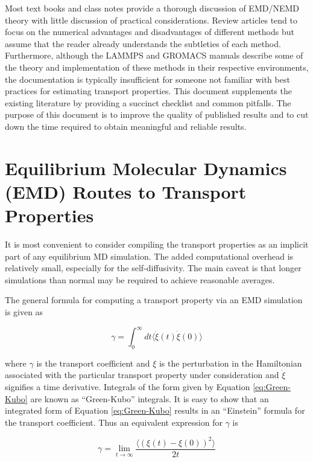 \documentclass[9pt]{livecoms}
\begin{document}
Most text books and class notes provide a thorough discussion of EMD/NEMD theory with little discussion of practical considerations. Review articles tend to focus on the numerical advantages and disadvantages of different methods but assume that the reader already understands the subtleties of each method. Furthermore, although the LAMMPS and GROMACS manuals describe some of the theory and implementation of these methods in their respective environments, the documentation is typically insufficient for someone not familiar with best practices for estimating transport properties. This document supplements the existing literature by providing a succinct checklist and common pitfalls. The purpose of this document is to improve the quality of published results and to cut down the time required to obtain meaningful and reliable results. %

\section{Equilibrium Molecular Dynamics (EMD) Routes to Transport Properties}

It is most convenient to consider compiling the transport properties as an implicit part of any equilibrium MD simulation. The added computational overhead is relatively small, especially for the self-diffusivity. The main caveat is that longer simulations than normal may be required to achieve reasonable averages. 

The general formula for computing a transport property via an EMD simulation is given as

\begin{equation} \label{eq:Green-Kubo}
\gamma = \int_{0}^{\infty}dt\langle\dot{\xi}(t)\dot{\xi}(0)\rangle
\end{equation}

where $\gamma$ is the transport coefficient and $\xi$ is the perturbation in the Hamiltonian associated with the particular transport property under consideration and $\dot{\xi}$ signifies a time derivative. Integrals of the form given by Equation \ref{eq:Green-Kubo} are known as “Green-Kubo” integrals. It is easy to show that an integrated form of Equation \ref{eq:Green-Kubo} results in an “Einstein” formula for the transport coefficient. Thus an equivalent expression for $\gamma$ is

\begin{equation} \label{eq:Einstein}
\gamma = \lim_{t\to\infty} \frac{\langle (\xi(t)-\xi(0))^2 \rangle}{2t}
\end{equation}
\end{document}
